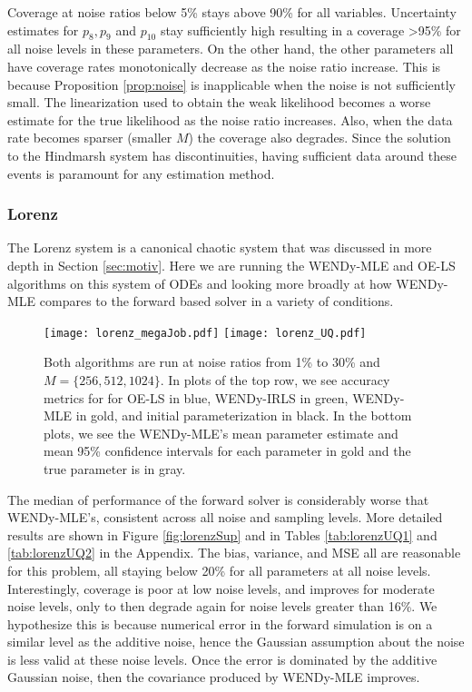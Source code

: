Coverage at noise ratios below 5\% stays above 90\% for all variables. Uncertainty estimates for $p_8,p_9$ and $p_{10}$ stay sufficiently high resulting in a coverage >95\% for all noise levels in these parameters. On the other hand, the other parameters all have coverage rates monotonically decrease as the noise ratio increase. This is because Proposition \ref{prop:noise} is inapplicable when the noise is not sufficiently small. The linearization used to obtain the weak likelihood becomes a worse estimate for the true likelihood as the noise ratio increases. Also, when the data rate becomes sparser (smaller $M$) the coverage also degrades. Since the solution to the Hindmarsh system has discontinuities, having sufficient data around these events is paramount for any estimation method. 

\subsubsection{Lorenz} \label{sec:lorenz-mega}

The Lorenz system is a canonical chaotic system that was discussed in more depth in Section \ref{sec:motiv}. Here we are running the WENDy-MLE and OE-LS algorithms on this system of ODEs and looking more broadly at how WENDy-MLE compares to the forward based solver in a variety of conditions.   
\begin{figure}[H]
	\centering
	\texttt{[image: lorenz\_megaJob.pdf]}
	\texttt{[image: lorenz\_UQ.pdf]}
	\caption{Both algorithms are run at noise ratios from 1\% to 30\% and $M = \{256, 512, 1024\}$. In plots of the top row, we see accuracy metrics for for OE-LS in blue, WENDy-IRLS in green, WENDy-MLE in gold, and initial parameterization in black. In the bottom plots, we see the WENDy-MLE's mean parameter estimate and mean 95\% confidence intervals for each parameter in gold and the true parameter is in gray.} 
	\label{fig:lorenzMega}
\end{figure}

The median of performance of the forward solver is considerably worse that WENDy-MLE's, consistent across all noise and sampling levels.  More detailed results are shown in Figure \ref{fig:lorenzSup} and in Tables \ref{tab:lorenzUQ1} and \ref{tab:lorenzUQ2} in the Appendix. The bias, variance, and MSE all are reasonable for this problem, all staying below 20\% for all parameters at all noise levels. Interestingly, coverage is poor at low noise levels, and improves for moderate noise levels, only to then degrade again for noise levels greater than 16\%. We hypothesize this is because numerical error in the forward simulation is on a similar level as the additive noise, hence the Gaussian assumption about the noise is less valid at these noise levels. Once the error is dominated by the additive Gaussian noise, then the covariance produced by WENDy-MLE improves.

